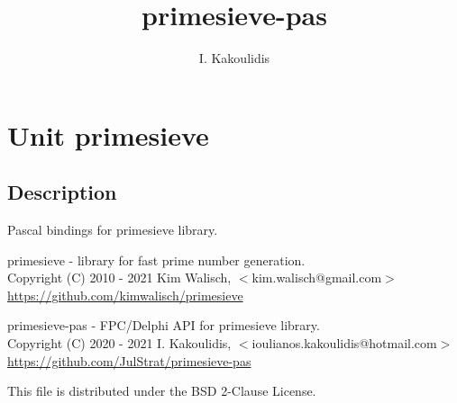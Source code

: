 \documentclass{report}
\begin{document}
\title{primesieve-pas}
\author{I. Kakoulidis}
\maketitle
\newpage
\label{toc}\tableofcontents
\newpage
\newlength{\tmplength}
\chapter{Unit primesieve}
\label{primesieve}
\section{Description}
Pascal bindings for primesieve library.

primesieve {-} library for fast prime number generation.\\{} Copyright (C) 2010 {-} 2021 Kim Walisch, {$<$}kim.walisch@gmail.com{$>$}\\{} \href{https://github.com/kimwalisch/primesieve}{https://github.com/kimwalisch/primesieve}

primesieve{-}pas {-} FPC/Delphi API for primesieve library.\\{} Copyright (C) 2020 {-} 2021 I. Kakoulidis, {$<$}ioulianos.kakoulidis@hotmail.com{$>$}\\{} \href{https://github.com/JulStrat/primesieve-pas}{https://github.com/JulStrat/primesieve-pas}

This file is distributed under the BSD 2{-}Clause License.
\end{document}
